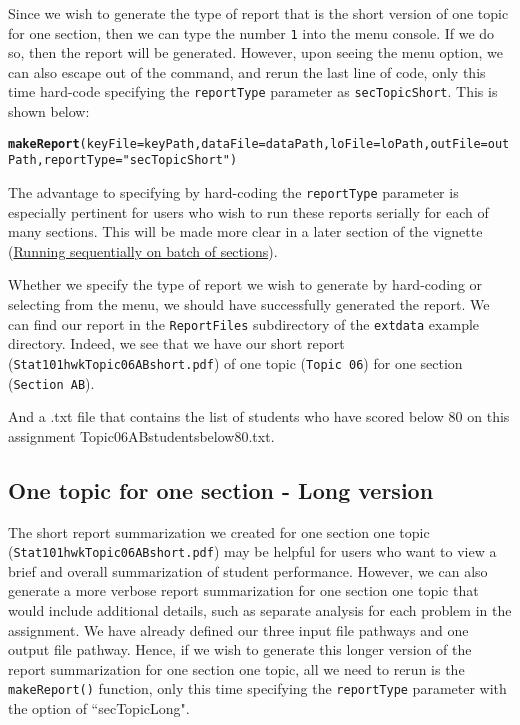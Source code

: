 \documentclass{article}\usepackage[]{graphicx}\usepackage[]{color}
\makeatletter
\newcommand{\hlstr}[1]{\textcolor[rgb]{0.192,0.494,0.8}{#1}}%
\newcommand{\hlstd}[1]{\textcolor[rgb]{0.345,0.345,0.345}{#1}}%
\newcommand{\hlkwc}[1]{\textcolor[rgb]{0.333,0.667,0.333}{#1}}%
\newcommand{\hlkwd}[1]{\textcolor[rgb]{0.737,0.353,0.396}{\textbf{#1}}}%
\newenvironment{kframe}{%
 \def\at@end@of@kframe{}%
 \ifinner\ifhmode%
  \def\at@end@of@kframe{\end{minipage}}%
  \begin{minipage}{\columnwidth}%
 \fi\fi%
 \def\FrameCommand##1{\hskip\@totalleftmargin \hskip-\fboxsep
 \colorbox{shadecolor}{##1}\hskip-\fboxsep
     \hskip-\linewidth \hskip-\@totalleftmargin \hskip\columnwidth}%
 \MakeFramed {\advance\hsize-\width
   \@totalleftmargin\z@ \linewidth\hsize
   \@setminipage}}%
 {\par\unskip\endMakeFramed%
 \at@end@of@kframe}
\newenvironment{knitrout}{}{} %
\numberwithin{equation}{section} %
\makeatother
\begin{document}
Since we wish to generate the type of report that is the short version of one topic for one section, then we can type the number \texttt{1} into the menu console. If we do so, then the report will be generated. However, upon seeing the menu option, we can also escape out of the command, and rerun the last line of code, only this time hard-code specifying the \texttt{reportType} parameter as \texttt{secTopicShort}. This is shown below:

\begin{knitrout}
\color{fgcolor}\begin{kframe}
\begin{alltt}
\hlkwd{makeReport}\hlstd{(}\hlkwc{keyFile}\hlstd{=keyPath,} \hlkwc{dataFile}\hlstd{=dataPath,} \hlkwc{loFile}\hlstd{=loPath,} \hlkwc{outFile}\hlstd{=outPath,} \hlkwc{reportType} \hlstd{=} \hlstr{"secTopicShort"}\hlstd{)}
\end{alltt}
\end{kframe}
\end{knitrout}

The advantage to specifying by hard-coding the \texttt{reportType} parameter is especially pertinent for users who wish to run these reports serially for each of many sections. This will be made more clear in a later section of the vignette (\hyperref[sec:sequential]{Running sequentially on batch of sections}).

Whether we specify the type of report we wish to generate by hard-coding or selecting from the menu, we should have successfully generated the report. We can find our report in the \texttt{ReportFiles} subdirectory of the \texttt{extdata} example directory. Indeed, we see that we have our short report (\texttt{Stat101hwkTopic06ABshort.pdf}) of one topic (\texttt{Topic 06}) for one section (\texttt{Section AB}).

And a .txt file that contains the list of students who have scored below 80 on this assignment {Topic06ABstudentsbelow80.txt}.

\subsection{One topic for one section - Long version}

The short report summarization we created for one section one topic (\texttt{Stat101hwkTopic06ABshort.pdf}) may be helpful for users who want to view a brief and overall summarization of student performance. However, we can also generate a more verbose report summarization for one section one topic that would include additional details, such as separate analysis for each problem in the assignment. We have already defined our three input file pathways and one output file pathway. Hence, if we wish to generate this longer version of the report summarization for one section one topic, all we need to rerun is the \texttt{makeReport()} function, only this time specifying the \texttt{reportType} parameter with the option of ``secTopicLong".
\end{document}
